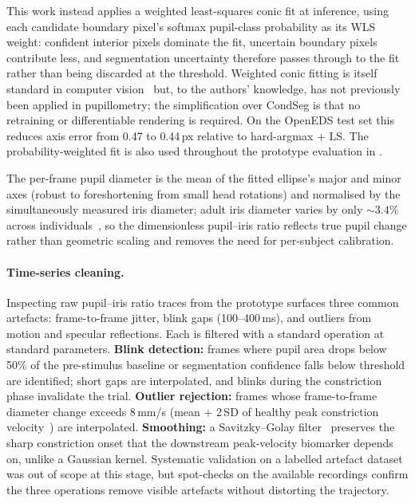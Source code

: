 This work instead applies a weighted least-squares conic fit at inference, using each candidate boundary pixel's softmax pupil-class probability as its WLS weight: confident interior pixels dominate the fit, uncertain boundary pixels contribute less, and segmentation uncertainty therefore passes through to the fit rather than being discarded at the threshold. Weighted conic fitting is itself standard in computer vision~\cite{kanatani2016ellipse} but, to the authors' knowledge, has not previously been applied in  pupillometry; the simplification over CondSeg is that no retraining or differentiable rendering is required. On the OpenEDS test set this reduces axis error from 0.47 to 0.44\,px relative to hard-argmax + LS. The probability-weighted fit is also used throughout the prototype evaluation in .

The per-frame pupil diameter is the mean of the fitted ellipse's major and minor axes (robust to foreshortening from small head rotations) and normalised by the simultaneously measured iris diameter; adult iris diameter varies by only ${\sim}3.4\%$ across individuals~\cite{boyle2021hvid}, so the dimensionless pupil--iris ratio reflects true pupil change rather than geometric scaling and removes the need for per-subject calibration.

\paragraph{Time-series cleaning.} Inspecting raw pupil--iris ratio traces from the prototype surfaces three common artefacts: frame-to-frame jitter, blink gaps (100--400\,ms), and outliers from motion and specular reflections. Each is filtered with a standard operation at standard parameters. \textbf{Blink detection:} frames where pupil area drops below 50\% of the pre-stimulus baseline or segmentation confidence falls below threshold are identified; short gaps are interpolated, and blinks during the constriction phase invalidate the trial. \textbf{Outlier rejection:} frames whose frame-to-frame diameter change exceeds 8\,mm/s (mean + 2\,SD of healthy peak constriction velocity~\cite{bremner2012pupillometric}) are interpolated. \textbf{Smoothing:} a Savitzky--Golay filter~\cite{savitzky1964smoothing} preserves the sharp constriction onset that the downstream peak-velocity biomarker depends on, unlike a Gaussian kernel. Systematic validation on a labelled artefact dataset was out of scope at this stage, but spot-checks on the available recordings confirm the three operations remove visible artefacts without distorting the  trajectory.


